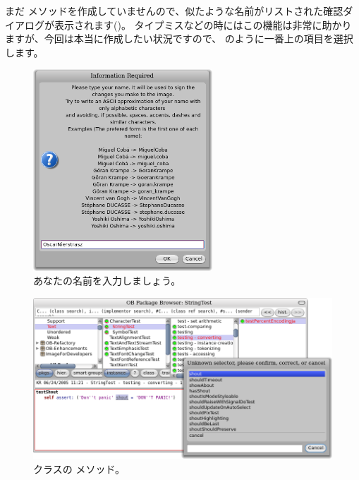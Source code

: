 \documentclass[a4paper,10pt,twoside]{book}
\begin{document}

まだ  メソッドを作成していませんので、似たような名前がリストされた確認ダイアログが表示されます()。
タイプミスなどの時にはこの機能は非常に助かりますが、今回は本当に作成したい状況ですので、 のように一番上の項目を選択します。



\begin{figure}[htb]
\centerline {\includegraphics[width=0.6\textwidth]{name}}
\caption{あなたの名前を入力しましょう。}
\end{figure}

\begin{figure}[htb]
\centerline {\includegraphics[width=\textwidth]{testShoutConfirm}}
\caption{ クラスの  メソッド。}
\end{figure}
\end{document}
